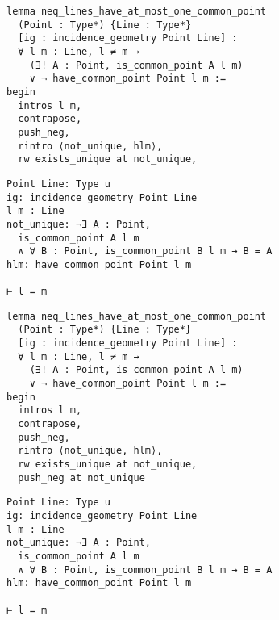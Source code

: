 \begin{frame}[fragile]
	\begin{multicols}{2}
		\begin{lstlisting}
lemma neq_lines_have_at_most_one_common_point 
  (Point : Type*) {Line : Type*} 
  [ig : incidence_geometry Point Line] :
  ∀ l m : Line, l ≠ m → 
    (∃! A : Point, is_common_point A l m) 
    ∨ ¬ have_common_point Point l m := 
begin
  intros l m,
  contrapose,
  push_neg,
  rintro ⟨not_unique, hlm⟩,
  rw exists_unique at not_unique,
\end{lstlisting}
		\columnbreak
		\begin{lstlisting}
Point Line: Type u
ig: incidence_geometry Point Line
l m : Line
not_unique: ¬∃ A : Point, 
  is_common_point A l m 
  ∧ ∀ B : Point, is_common_point B l m → B = A
hlm: have_common_point Point l m

⊢ l = m
		\end{lstlisting}
	\end{multicols}
\end{frame}










\begin{frame}[fragile]
	\begin{multicols}{2}
		\begin{lstlisting}
lemma neq_lines_have_at_most_one_common_point 
  (Point : Type*) {Line : Type*} 
  [ig : incidence_geometry Point Line] :
  ∀ l m : Line, l ≠ m → 
    (∃! A : Point, is_common_point A l m) 
    ∨ ¬ have_common_point Point l m := 
begin
  intros l m,
  contrapose,
  push_neg,
  rintro ⟨not_unique, hlm⟩,
  rw exists_unique at not_unique,
  push_neg at not_unique
\end{lstlisting}
		\columnbreak
		\begin{lstlisting}
Point Line: Type u
ig: incidence_geometry Point Line
l m : Line
not_unique: ¬∃ A : Point, 
  is_common_point A l m 
  ∧ ∀ B : Point, is_common_point B l m → B = A
hlm: have_common_point Point l m

⊢ l = m
		\end{lstlisting}
	\end{multicols}
\end{frame}











